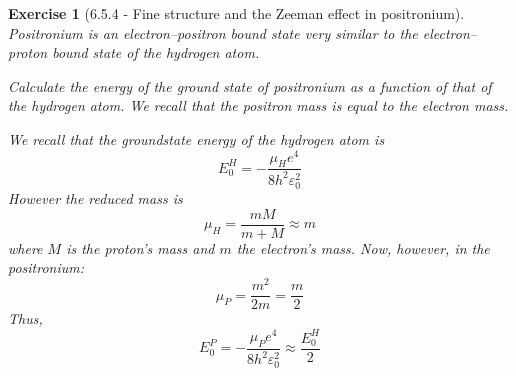 \documentclass[12pt]{article}
\def\be{\begin{equation}}
\def\ee{\end{equation}}
\def\f{\frac}
\newtheorem{exercise}{Exercise}
\begin{document}
	\begin{exercise}[6.5.4 - Fine structure and the Zeeman effect in positronium]
		Positronium is an electron–positron bound state very similar to the electron–proton bound state of the hydrogen atom.
		\begin{exercises}
			\item Calculate the energy of the ground state of positronium as a function of that of the hydrogen atom. We recall that the positron mass is equal to the electron mass.
			\begin{multianswer}
				We recall that the groundstate energy of the hydrogen atom is
				\be
					E_0^H = -\f{\mu_H e^4}{8h^2\varepsilon_0^2}
				\ee
				However the reduced mass is
				\be
					\mu_H = \f{mM}{m+M} \approx m
				\ee
				where $M$ is the proton's mass and $m$ the electron's mass. Now, however, in the positronium:
				\be
					\mu_P = \f{m^2}{2m} = \f{m}{2}
				\ee
				Thus,
				\be
					E_0^P = -\f{\mu_P e^4}{8h^2\varepsilon_0^2} \approx \f{E_0^H}{2} 
				\ee
			\end{multianswer}
			

\end{exercises}
\end{exercise}
\end{document}
